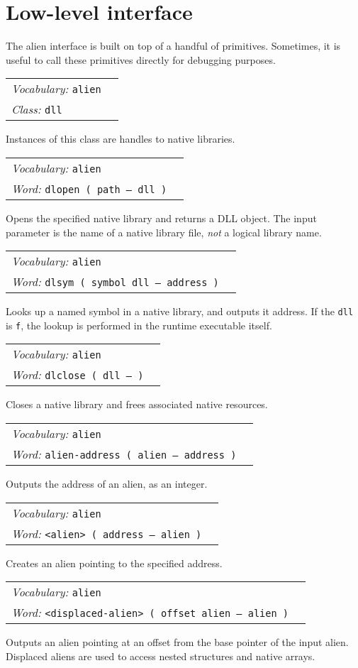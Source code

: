 \documentclass{book}
\newcommand{\vocabulary}[1]{\emph{Vocabulary:} \texttt{#1}&\\}
\newcommand{\ordinaryword}[2]{\index{\texttt{#1}}\emph{Word:} \texttt{#2}&\\}
\newcommand{\classword}[1]{\index{\texttt{#1}}\emph{Class:} \texttt{#1}&\\}
\newcommand{\wordtable}[1]{


\begin{tabularx}{12cm}{lX}
\hline
#1
\hline
\end{tabularx}

}
\begin{document}
\section{Low-level interface}\label{alien-internals}

The alien interface is built on top of a handful of primitives. Sometimes, it is
useful to call these primitives directly for debugging purposes.

\wordtable{
\vocabulary{alien}
\classword{dll}
}
Instances of this class are handles to native libraries.
\wordtable{
\vocabulary{alien}
\ordinaryword{dlopen}{dlopen ( path -- dll )}
}
Opens the specified native library and returns a DLL object. The input parameter is the
name of a native library file,
\emph{not} a logical library name.
\wordtable{
\vocabulary{alien}
\ordinaryword{dlsym}{dlsym ( symbol dll -- address )}
}
Looks up a named symbol in a native library, and outputs it address. If the \verb|dll| is \verb|f|, the lookup is performed in the runtime executable itself.
\wordtable{
\vocabulary{alien}
\ordinaryword{dlclose}{dlclose ( dll -- )}
}
Closes a native library and frees associated native resources.

\wordtable{
\vocabulary{alien}
\ordinaryword{alien-address}{alien-address ( alien -- address )}
}
Outputs the address of an alien, as an integer.

\wordtable{
\vocabulary{alien}
\ordinaryword{<alien>}{<alien> ( address -- alien )}
}
Creates an alien pointing to the specified address.

\wordtable{
\vocabulary{alien}
\ordinaryword{<displaced-alien>}{<displaced-alien> ( offset alien -- alien )}
}
Outputs an alien pointing at an offset from the base pointer of the input alien. Displaced aliens are used to access nested structures and native arrays.
\end{document}
